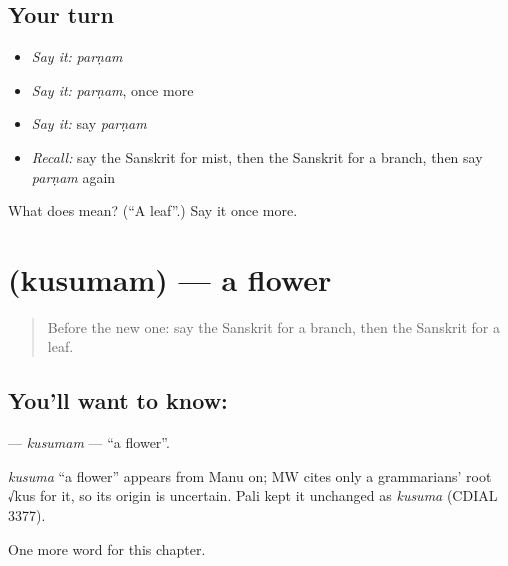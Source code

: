 \subsection*{Your turn}
\begin{itemize}
\raggedright
  \item \emph{Say it:} \emph{parṇam}
  \item \emph{Say it:} \emph{parṇam}, once more
  \item \emph{Say it:} say \emph{parṇam}
  \item \emph{Recall:} say the Sanskrit for mist, then the Sanskrit for a branch, then say \emph{parṇam} again
\end{itemize}

\begin{tcolorbox}[breakable,colback=teal!4,colframe=teal!35!black,title={Before you move on}]
What does  mean? (\textquotedblleft{}A leaf\textquotedblright{}.) Say it once more.
\end{tcolorbox}
\section[\texorpdfstring{\sk{कुसुमम्} (kusumam)}{कुसुमम् (kusumam)}]{ (kusumam) — a flower}

\label{lesson:SA-C111-kusumam}



\begin{quote}
Before the new one: say the Sanskrit for a branch, then the Sanskrit for a leaf.
\end{quote}

\subsection*{You'll want to know: }
\textbf{} — \emph{kusumam} — \textquotedblleft{}a flower\textquotedblright{}.

\begin{cousinweb}
\emph{kusuma} \textquotedblleft{}a flower\textquotedblright{} appears from Manu on; MW cites only a grammarians' root √kus for it, so its origin is uncertain. Pali kept it unchanged as \emph{kusuma} (CDIAL 3377).
\end{cousinweb}

\begin{grammarlens}[title={What you've built}]
One more word for this chapter.
\end{grammarlens}

